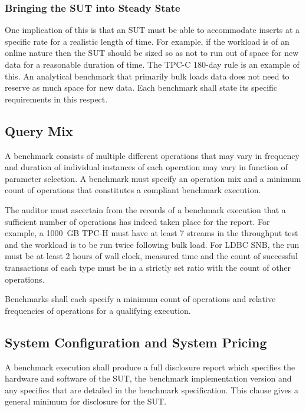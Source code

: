 \subsubsection{Bringing the SUT into Steady State} One implication of this is that an SUT must be able to accommodate inserts at a specific rate for a realistic length of time. For example, if the workload is of an online nature then the SUT should be sized so as not to run out of space for new data for a reasonable duration of time. The TPC-C 180-day rule is an example of this. An analytical benchmark that primarily bulk loads data does not need to reserve as much space for new data. Each benchmark shall state its specific requirements in this respect.

\subsection{Query Mix}

A benchmark consists of multiple different operations that may vary in frequency and duration of individual
instances of each operation may vary in function of parameter selection. A benchmark must specify an operation
mix and a minimum count of operations that constitutes a compliant benchmark execution.

The auditor must ascertain from the records of a benchmark execution that a sufficient number of operations has indeed taken place for the report. For example, a 1000~GB TPC-H must have at least 7 streams in the throughput test and the workload is to be run twice following bulk load. For LDBC SNB, the run must be at least 2 hours of wall clock, measured time and the count of successful transactions of each type must be in a strictly set ratio with the count of other operations. 

Benchmarks shall each specify a minimum count of operations and relative frequencies of operations for a qualifying
execution.

\subsection{System Configuration and System Pricing}
\label{sec:system-config}


A benchmark execution shall produce a full disclosure report which specifies the hardware and software of the SUT, the benchmark implementation version and any specifics that are detailed in the benchmark specification. This clause gives a general minimum for disclosure for the SUT.


